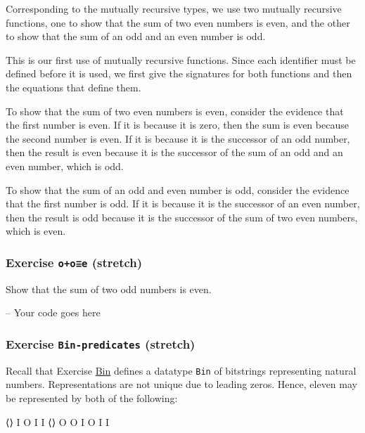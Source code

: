 Corresponding to the mutually recursive types, we use two mutually
recursive functions, one to show that the sum of two even numbers is
even, and the other to show that the sum of an odd and an even number is
odd.

This is our first use of mutually recursive functions. Since each
identifier must be defined before it is used, we first give the
signatures for both functions and then the equations that define them.

To show that the sum of two even numbers is even, consider the evidence
that the first number is even. If it is because it is zero, then the sum
is even because the second number is even. If it is because it is the
successor of an odd number, then the result is even because it is the
successor of the sum of an odd and an even number, which is odd.

To show that the sum of an odd and even number is odd, consider the
evidence that the first number is odd. If it is because it is the
successor of an even number, then the result is odd because it is the
successor of the sum of two even numbers, which is even.

\hypertarget{Relations-odd-plus-odd}{%
\subsubsection{\texorpdfstring{Exercise \texttt{o+o≡e}
(stretch)}{Exercise o+o≡e (stretch)}}\label{Relations-odd-plus-odd}}

Show that the sum of two odd numbers is even.

\begin{fence}
\begin{code}
-- Your code goes here
\end{code}
\end{fence}

\hypertarget{Relations-Bin-predicates}{%
\subsubsection{\texorpdfstring{Exercise \texttt{Bin-predicates}
(stretch)}{Exercise Bin-predicates (stretch)}}\label{Relations-Bin-predicates}}

Recall that Exercise \protect\hyperlink{Naturals-Bin}{Bin} defines a
datatype \texttt{Bin} of bitstrings representing natural numbers.
Representations are not unique due to leading zeros. Hence, eleven may
be represented by both of the following:

\begin{myDisplay}
⟨⟩ I O I I
⟨⟩ O O I O I I
\end{myDisplay}

